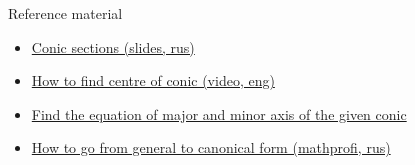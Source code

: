\documentclass[aspectratio=169,notes]{beamer}
\newcommand{\fbckg}[1]{\usebackgroundtemplate{\texttt{[image: \#1]}}}%
\begin{document}
\begin{frame}[t]{Reference material}
    \Large
    \begin{itemize}
        \item \href{https://ppt-online.org/842240}{Conic sections (slides, rus)}
        \item \href{https://www.youtube.com/watch?v=GaSrBIUGdWs}{How to find centre of conic (video, eng)}
        \item \href{https://math.stackexchange.com/questions/2235355/find-major-and-minor-axis-of-given-conic}{Find the equation of major and minor axis of the given conic}
        \item \href{http://mathprofi.ru/kak_privesti_uravnenie_linii_2_poryadka_k_kanonicheskomu_vidu.html}{How to go from general to canonical form (mathprofi, rus)}
    \end{itemize}
\end{frame}

\fbckg{fibeamer/figs/last_page.png}
\frame[plain]{}
\end{document}
